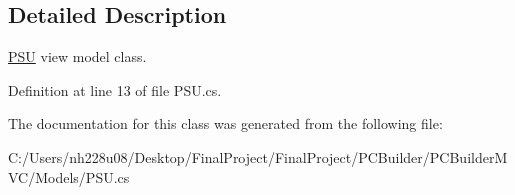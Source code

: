 \subsection{Detailed Description}
\hyperlink{class_p_c_builder_m_v_c_1_1_models_1_1_p_s_u}{P\+SU} view model class. 



Definition at line 13 of file P\+S\+U.\+cs.



The documentation for this class was generated from the following file\+:\begin{DoxyCompactItemize}
\item 
C\+:/\+Users/nh228u08/\+Desktop/\+Final\+Project/\+Final\+Project/\+P\+C\+Builder/\+P\+C\+Builder\+M\+V\+C/\+Models/P\+S\+U.\+cs\end{DoxyCompactItemize}
